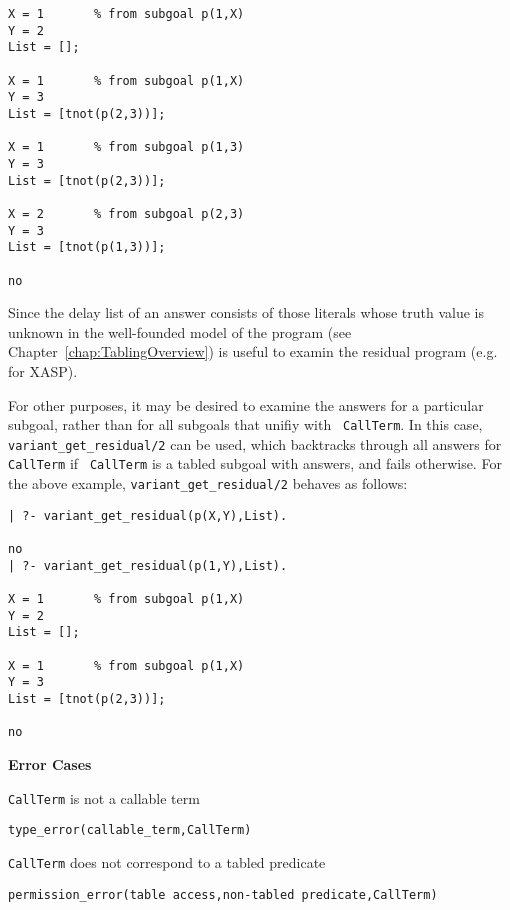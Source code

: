 \begin{description}
\begin{example}
\begin{center}
\begin{small}
\begin{verbatim}
X = 1       % from subgoal p(1,X)
Y = 2
List = [];

X = 1       % from subgoal p(1,X)
Y = 3
List = [tnot(p(2,3))];

X = 1       % from subgoal p(1,3)
Y = 3
List = [tnot(p(2,3))];

X = 2       % from subgoal p(2,3)
Y = 3
List = [tnot(p(1,3))];

no
\end{verbatim}
\end{small}
\end{center}
\end{example}

Since the delay list of an answer consists of those literals whose
truth value is unknown in the well-founded model of the program (see
Chapter~\ref{chap:TablingOverview})  is useful
to examin the residual program (e.g. for XASP).

For other purposes, it may be desired to examine the answers for a
particular subgoal, rather than for all subgoals that unifiy with {\tt
  CallTerm}.  In this case, {\tt variant\_get\_residual/2} can be
used, which backtracks through all answers for {\tt CallTerm} if {\tt
  CallTerm} is a tabled subgoal with answers, and fails otherwise.
For the above example, {\tt variant\_get\_residual/2} behaves as
follows:

\begin{center}
\begin{small}
\begin{verbatim} 
| ?- variant_get_residual(p(X,Y),List).

no
| ?- variant_get_residual(p(1,Y),List).

X = 1       % from subgoal p(1,X)
Y = 2
List = [];

X = 1       % from subgoal p(1,X)
Y = 3
List = [tnot(p(2,3))];

no
\end{verbatim}
\end{small}
\end{center}

{\bf Error Cases}
\bi
\item {\tt CallTerm} is not a callable term
\bi
\item {\tt type\_error(callable\_term,CallTerm)}
\ei
\item {\tt CallTerm} does not correspond to a tabled predicate
\bi
\item 	{\tt permission\_error(table access,non-tabled predicate,{\tt CallTerm})}
\ei
\ei


\end{description}

